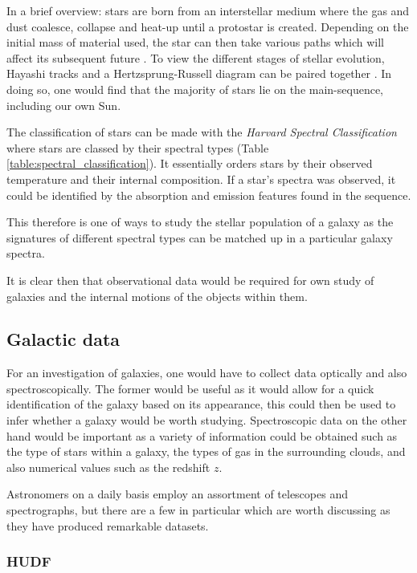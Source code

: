 \documentclass[12pt, twocolumn]{revtex4}    %
\begin{document}
In a brief overview: stars are born from an interstellar medium where the gas and dust coalesce, collapse and heat-up until a protostar is created. Depending on the initial mass of material used, the star can then take various paths which will affect its subsequent future \citep{mccoy_space_sciences}. To view the different stages of stellar evolution, Hayashi tracks and a Hertzsprung-Russell diagram can be paired together \citep{carroll_astro}. In doing so, one would find that the majority of stars lie on the main-sequence, including our own Sun.  


The classification of stars can be made with the \textit{Harvard Spectral Classification} where stars are classed by their spectral types (Table \ref{table:spectral_classification}). It essentially orders stars by their observed temperature and their internal composition. If a star's spectra was observed, it could be identified by the absorption and emission features found in the sequence.   

This therefore is one of ways to study the stellar population of a galaxy as the signatures of different spectral types can be matched up in a particular galaxy spectra. 

It is clear then that observational data would be required for own study of galaxies and the internal motions of the objects within them. 

\subsection{Galactic data} 

For an investigation of galaxies, one would have to collect data optically and also spectroscopically. The former would be useful as it would allow for a quick identification of the galaxy based on its appearance, this could then be used to infer whether a galaxy would be worth studying. Spectroscopic data on the other hand would be important as a variety of information could be obtained such as the type of stars within a galaxy, the types of gas in the surrounding clouds, and also numerical values such as the redshift $z$. 

Astronomers on a daily basis employ an assortment of telescopes and spectrographs, but there are a few in particular which are worth discussing as they have produced remarkable datasets.

\subsubsection{HUDF}
\end{document}

